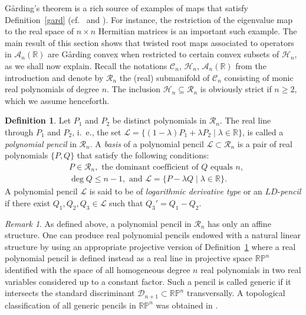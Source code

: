 \documentclass[10pt,twoside,a4paper,reqno]{amsart}
\theoremstyle{plain}
\theoremstyle{definition}
\newtheorem{defi+}           {Definition}
\theoremstyle{remark}
\newtheorem{rema+}           {Remark}
\newenvironment{remark}{\begin{rema+}}{\end{rema+}}
\newenvironment{definition}{\begin{defi+}}{\end{defi+}}
\newcommand {\bR} {\mathbb {R}}
\newcommand {\bPR} {\mathbb {RP}}
\newcommand {\la} {\lambda}
\newcommand {\calL} {\mathcal {L}}
\newcommand {\calH} {\mathcal {H}}
\newcommand {\calC} {\mathcal {C}}
\newcommand {\calD} {\mathcal {D}}
\newcommand {\calR} {\mathcal {R}}
\newcommand {\calA} {\mathcal {A}}
\begin{document}
G\aa rding's theorem is a rich source of examples of maps that 
satisfy Definition~\ref{gard} (cf.~\cite{G} and \cite{BGLS}). For instance, 
the restriction 
of the eigenvalue map to the real space of $n\times n$ Hermitian matrices is 
an important such example. 
The main result of this section shows 
that twisted root maps associated to operators in $\calA_n(\bR)$ are 
G\aa rding convex when restricted to certain convex subsets of 
$\calH_n$, as we shall now explain. Recall the notations $\calC_n$, 
$\calH_n$, $\calA_n(\bR)$ from the introduction and denote by $\calR_n$ the 
(real) submanifold of $\calC_n$ consisting of monic real polynomials of 
degree $n$. The inclusion $\calH_n\subseteq \calR_n$ is obviously strict if 
$n\ge 2$, which we assume henceforth.

\begin{definition}\label{pen}
Let $P_1$ and $P_2$ be distinct polynomials in $\calR_n$. The real line 
through $P_1$ and $P_2$, i.~e., the set 
$\calL=\{(1-\la)P_1+\la P_2\mid\la \in \bR\}$, is called a
{\em polynomial pencil} in $\calR_n$. A {\em basis} of a polynomial pencil 
$\calL\subset \calR_n$ is a pair of real 
polynomials $\{P,Q\}$ that satisfy the following conditions:
\begin{equation}\label{bas}
\begin{split}
&P\in \calR_n, \text{ the dominant coefficient of $Q$ equals } n,\\
&\!\deg Q\le n-1, \text{ and } \calL=\{P-\la Q\mid\la \in \bR\}. 
\end{split}
\end{equation}
A polynomial pencil $\calL$ is said to be of 
{\em logarithmic derivative type} or an $LD$-{\em pencil} if there 
exist $Q_1, Q_2, Q_3\in \calL$ such that $Q_3'=Q_1-Q_2$.
\end{definition}

\begin{remark}
As defined above, a polynomial pencil in $\calR_n$ has only 
an affine structure. One can produce real polynomial pencils endowed with
a natural linear structure by using an appropriate projective version 
of Definition~\ref{pen} where a real polynomial pencil is defined instead as 
a real line in projective space $\bPR^n$ identified with the space of all 
homogeneous degree $n$ real polynomials in two real variables considered up to
a constant factor. Such a pencil is called generic if it intersects the
standard discriminant $\calD_{n+1}\subset \bPR^n$ transversally. 
A topological classification of all generic pencils in $\bPR^n$ was 
obtained in \cite{BS1}.
\end{remark}
\end{document}
